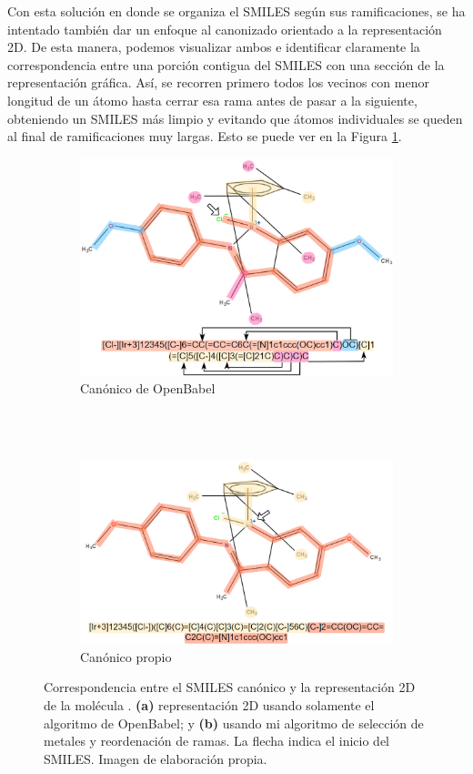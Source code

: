 \pagebreak

Con esta solución en donde se organiza el SMILES según sus ramificaciones, se ha intentado también dar un enfoque al canonizado orientado a la representación 2D. De esta manera, podemos visualizar ambos e identificar claramente la correspondencia entre una porción contigua del SMILES con una sección de la representación gráfica. Así, se recorren primero todos los vecinos con menor longitud de un átomo hasta cerrar esa rama antes de pasar a la siguiente, obteniendo un SMILES más limpio y evitando que átomos individuales se queden al final de ramificaciones muy largas. Esto se puede ver en la Figura \ref{fig:smiles_vs_dibujo}.

\begin{figure}[h!]
\begin{subfigure}{.9\textwidth}
  \centering
  \includegraphics[width=.8\linewidth]{imagenes/resultados/moleculas/mol31_subrayao_malCanon.png}
  \caption{Canónico de OpenBabel}
\end{subfigure}%
\\
\\
\begin{subfigure}{.9\textwidth}
  \centering
  \includegraphics[width=.8\linewidth]{imagenes/resultados/moleculas/mol31_subrayao.png}
  \caption{Canónico propio}
\end{subfigure}
\caption{Correspondencia entre el SMILES canónico y la representación 2D de la molécula . \textbf{(a)} representación 2D usando solamente el algoritmo de OpenBabel; y \textbf{(b)} usando mi algoritmo de selección de metales y reordenación de ramas. La flecha indica el inicio del SMILES. Imagen de elaboración propia.}
\label{fig:smiles_vs_dibujo}
\end{figure}

